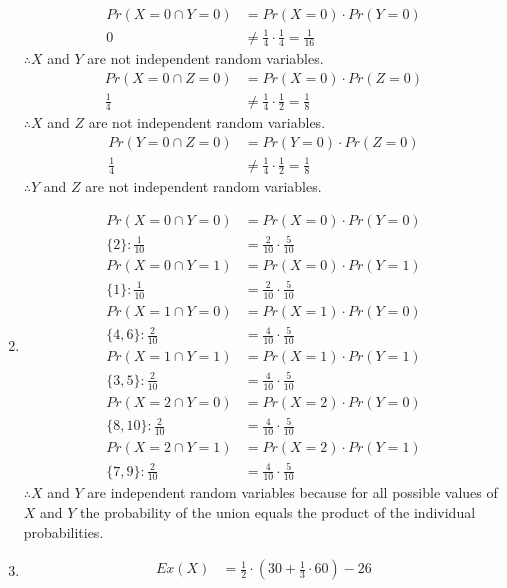\documentclass{article}
\begin{document}
\begin{enumerate}
\begin{align*}
				Pr(X = 0 \cap Y = 0) &= Pr(X = 0) \cdot Pr(Y = 0) \\
				0 &\ne \frac{1}{4} \cdot \frac{1}{4} = \frac{1}{16}
			\end{align*}
			$\therefore X$ and $Y$ are not independent random variables.
			\begin{align*}
				Pr(X = 0 \cap Z = 0) &= Pr(X = 0) \cdot Pr(Z = 0) \\
				\frac{1}{4} &\ne \frac{1}{4} \cdot \frac{1}{2} = \frac{1}{8}
			\end{align*}
			$\therefore X$ and $Z$ are not independent random variables.
			\begin{align*}
				Pr(Y = 0 \cap Z = 0) &= Pr(Y = 0) \cdot Pr(Z = 0) \\
				\frac{1}{4} &\ne \frac{1}{4} \cdot \frac{1}{2} = \frac{1}{8}
			\end{align*}
			$\therefore Y$ and $Z$ are not independent random variables.
		\item %
			\begin{align*}
				Pr(X = 0 \cap Y = 0) &= Pr(X = 0) \cdot Pr(Y = 0) \\
				\{2\}: \frac{1}{10} &= \frac{2}{10} \cdot \frac{5}{10} \\
				Pr(X = 0 \cap Y = 1) &= Pr(X = 0) \cdot Pr(Y = 1) \\
				\{1\}: \frac{1}{10} &= \frac{2}{10} \cdot \frac{5}{10} \\
				Pr(X = 1 \cap Y = 0) &= Pr(X = 1) \cdot Pr(Y = 0) \\
				\{4, 6\}: \frac{2}{10} &= \frac{4}{10} \cdot \frac{5}{10} \\
				Pr(X = 1 \cap Y = 1) &= Pr(X = 1) \cdot Pr(Y = 1) \\
				\{3, 5\}: \frac{2}{10} &= \frac{4}{10} \cdot \frac{5}{10} \\
				Pr(X = 2 \cap Y = 0) &= Pr(X = 2) \cdot Pr(Y = 0) \\
				\{8, 10\}: \frac{2}{10} &= \frac{4}{10} \cdot \frac{5}{10} \\
				Pr(X = 2 \cap Y = 1) &= Pr(X = 2) \cdot Pr(Y = 1) \\
				\{7, 9\}: \frac{2}{10} &= \frac{4}{10} \cdot \frac{5}{10}
			\end{align*}
			$\therefore X$ and $Y$ are independent random variables because for all possible values of $X$ and $Y$ the probability of the union equals the product of the individual probabilities.
		\item %
			\begin{align*}
				Ex(X) &= \frac{1}{2} \cdot (30 + \frac{1}{3} \cdot 60) - 26 \\

\end{align*}
\end{enumerate}
\end{document}

